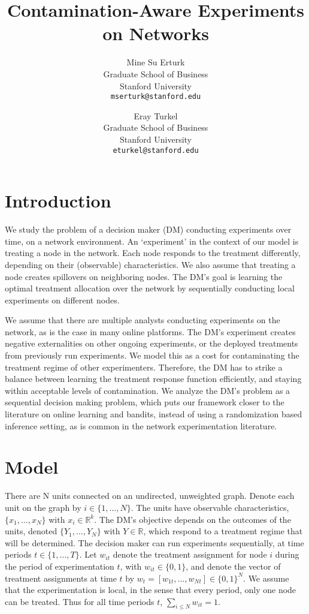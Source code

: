 \documentclass[11pt,a4paper]{article}
\title{ Contamination-Aware Experiments on Networks }
\author{
Mine Su Erturk\\
Graduate School of Business\\
Stanford University\\
   \texttt{mserturk@stanford.edu} 
  \and
Eray Turkel\\
Graduate School of Business\\
Stanford University\\
   \texttt{eturkel@stanford.edu} 
}
\date{}
\begin{document}
\maketitle

\section{Introduction}
We study the problem of a decision maker (DM) conducting experiments over time, on a network environment. An `experiment' in the context of our model is treating a node in the network. Each node responds to the treatment differently, depending on their (observable) characteristics. We also assume that treating a node creates spillovers on neighboring nodes. The DM's goal is learning the optimal treatment allocation over the network by sequentially conducting local experiments on different nodes. 

We assume that there are multiple analysts conducting experiments on the network, as is the case in many online platforms. The DM's experiment creates negative externalities on other ongoing experiments, or the deployed treatments from previously run experiments. We model this as a cost for contaminating the treatment regime of other experimenters. Therefore, the DM has to strike a balance between learning the treatment response function efficiently, and staying within acceptable levels of contamination. We analyze the DM's problem as a sequential decision making problem, which puts our framework closer to the literature on online learning and bandits, instead of using a randomization based inference setting, as is common in the network experimentation literature.

\section{Model}

There are N units connected on an undirected, unweighted graph. Denote each unit on the graph by $i \in \{1, \dots, N \}$. The units have observable characteristics, $\{x_1 , \dots, x_N \}$ with $x_i \in \mathbb{R}^k$. The DM's objective depends on the outcomes of the units, denoted $\{Y_1 , \dots, Y_N\}$ with $Y \in \mathbb{R}$, which respond to a treatment regime that will be determined. The decision maker can run experiments sequentially, at time periods $t \in \{1, \dots , T\}$. Let $w_{it}$ denote the treatment assignment for node $i$ during the period of experimentation $t$, with $w_{it} \in \{0,1\}$, and denote the vector of treatment assignments at time $t$ by $w_t = [w_{1t}, \dots , w_{Nt}] \in \{0,1\}^N$. We assume that the experimentation is local, in the sense that every period, only one node can be treated. Thus for all time periods $t$, $\sum_{i \leq N} w_{it} = 1$.
\end{document}

